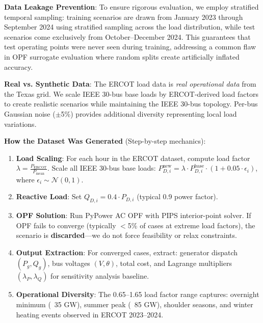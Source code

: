 \documentclass[journal,12pt,onecolumn]{IEEEtran}
\begin{document}
\textbf{Data Leakage Prevention}: To ensure rigorous evaluation, we employ stratified temporal sampling: training scenarios are drawn from January 2023 through September 2024 using stratified sampling across the load distribution, while test scenarios come exclusively from October--December 2024. This guarantees that test operating points were never seen during training, addressing a common flaw in OPF surrogate evaluation where random splits create artificially inflated accuracy.

\textbf{Real vs. Synthetic Data}: The ERCOT load data is \textit{real operational data} from the Texas grid. We scale IEEE 30-bus base loads by ERCOT-derived load factors to create realistic scenarios while maintaining the IEEE 30-bus topology. Per-bus Gaussian noise ($\pm$5\%) provides additional diversity representing local load variations.

\textbf{How the Dataset Was Generated} (Step-by-step mechanics):
\begin{enumerate}
    \item \textbf{Load Scaling}: For each hour in the ERCOT dataset, compute load factor $\lambda = \frac{P_{\text{ERCOT}}}{P_{\text{mean}}}$. Scale all IEEE 30-bus base loads: $P_{D,i}^{\text{new}} = \lambda \cdot P_{D,i}^{\text{base}} \cdot (1 + 0.05 \cdot \epsilon_i)$, where $\epsilon_i \sim \mathcal{N}(0,1)$.
    
    \item \textbf{Reactive Load}: Set $Q_{D,i} = 0.4 \cdot P_{D,i}$ (typical 0.9 power factor).
    
    \item \textbf{OPF Solution}: Run PyPower AC OPF with PIPS interior-point solver. If OPF fails to converge (typically $<$5\% of cases at extreme load factors), the scenario is \textbf{discarded}---we do not force feasibility or relax constraints.
    
    \item \textbf{Output Extraction}: For converged cases, extract: generator dispatch $(P_g, Q_g)$, bus voltages $(V, \theta)$, total cost, and Lagrange multipliers $(\lambda_P, \lambda_Q)$ for sensitivity analysis baseline.
    
    \item \textbf{Operational Diversity}: The 0.65--1.65 load factor range captures: overnight minimum (~35 GW), summer peak (~85 GW), shoulder seasons, and winter heating events observed in ERCOT 2023--2024.
\end{enumerate}
\end{document}
